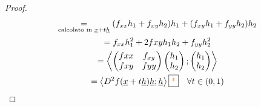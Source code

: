 \documentclass[a4paper, oneside]{article}
\begin{document}
\begin{proof}
\begin{gather*}
            \underset{\text{calcolato in }\underline{x} +t \underline{h}}{=} (f_{xx} h_1 + f_{xy}h_2)h_1 +(f_{xy} h_1 + f_{yy}h_2)h_2\\
            = f_{xx} h_1^2 + 2f{xy}h_1 h_2 + f_{yy}h_2^2 \\
            = \left\langle \begin{pmatrix}
                f{xx} & f_{xy}\\
                f{xy} & f{yy}
            \end{pmatrix}
            \begin{pmatrix}
                h_1\\h_2
            \end{pmatrix};\begin{pmatrix}
                h_1\\h_2
            \end{pmatrix}\right\rangle \\
            = \left\langle D^2f(\underline{x} + t \underline{h})\underline{h} ; \underline{h}\right\rangle \text{\fbox{\textcolor{orange}{*}}} \quad \forall t \in (0,1)
            \end{gather*}
        \end{proof}
\end{document}
